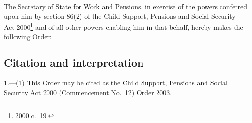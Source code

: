 \documentclass[12pt,a4paper]{article}
\title{\regstitle}
\author{S.I.\ 2003 No.\ 192}
\date{Made
3rd February 2003\\
}
\begin{document}
\maketitle

\noindent
The Secretary of State for Work and Pensions, in exercise of the powers conferred upon him by section 86(2) of the Child Support, Pensions and Social Security Act 2000\footnote{2000 c.\ 19.} and of all other powers enabling him in that behalf, hereby makes the following Order: 

{\sloppy

\tableofcontents

}

\bigskip

\setcounter{secnumdepth}{-2}

\subsection[1. Citation and interpretation]{Citation and interpretation}

1.---(1)  This Order may be cited as the Child Support, Pensions and Social Security Act 2000 (Commencement No.\ 12) Order 2003.
\end{document}
